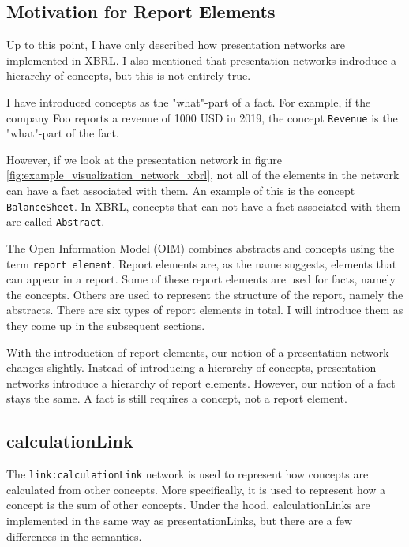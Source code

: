\subsection{Motivation for Report Elements}
\label{sec:report_elements_motivation}

Up to this point, I have only described how presentation networks are implemented in XBRL.
I also mentioned that presentation networks indroduce a hierarchy of concepts, but this is not entirely true.

I have introduced concepts as the "what"-part of a fact. 
For example, if the company Foo reports a revenue of 1000 USD in 2019, the concept \texttt{Revenue} is the "what"-part of the fact.

However, if we look at the presentation network in figure \ref{fig:example_visualization_network_xbrl}, not all of the elements in the network can have a fact associated with them.
An example of this is the concept \texttt{BalanceSheet}.
In XBRL, concepts that can not have a fact associated with them are called \texttt{Abstract}.

The Open Information Model (OIM) combines abstracts and concepts using the term \texttt{report element}.
Report elements are, as the name suggests, elements that can appear in a report.
Some of these report elements are used for facts, namely the concepts.
Others are used to represent the structure of the report, namely the abstracts.
There are six types of report elements in total\cite{oim}. 
I will introduce them as they come up in the subsequent sections.

With the introduction of report elements, our notion of a presentation network changes slightly.
Instead of introducing a hierarchy of concepts, presentation networks introduce a hierarchy of report elements.
However, our notion of a fact stays the same.
A fact is still requires a concept, not a report element.

\subsection{calculationLink}

The \texttt{link:calculationLink} network is used to represent how concepts are calculated from other concepts.
More specifically, it is used to represent how a concept is the sum of other concepts.
Under the hood, calculationLinks are implemented in the same way as presentationLinks, but there are a few differences in the semantics.

